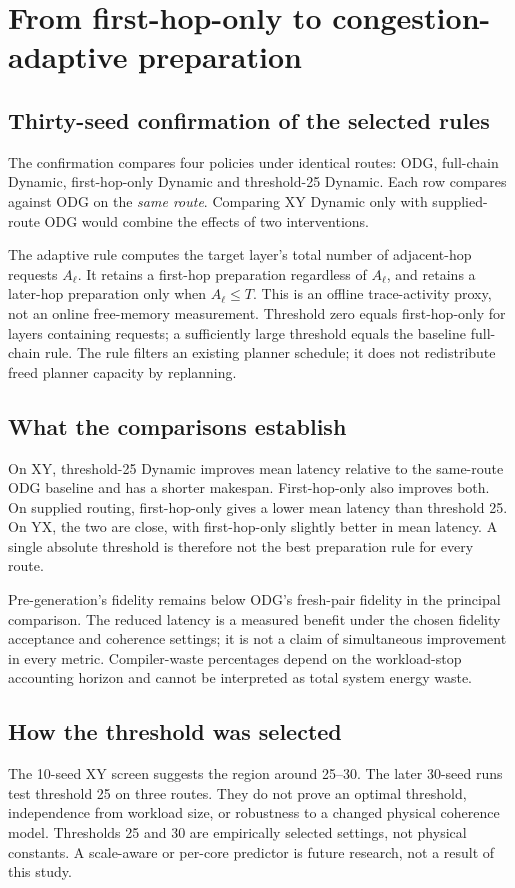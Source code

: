 \documentclass[11pt,a4paper,oneside]{report}
\begin{document}
\chapter{From first-hop-only to congestion-adaptive preparation}
\section{Thirty-seed confirmation of the selected rules}
The confirmation compares four policies under identical routes: ODG, full-chain Dynamic, first-hop-only Dynamic and threshold-25 Dynamic. Each row compares against ODG on the \emph{same route}. Comparing XY Dynamic only with supplied-route ODG would combine the effects of two interventions.

The adaptive rule computes the target layer's total number of adjacent-hop requests $A_\ell$. It retains a first-hop preparation regardless of $A_\ell$, and retains a later-hop preparation only when $A_\ell\le T$. This is an offline trace-activity proxy, not an online free-memory measurement. Threshold zero equals first-hop-only for layers containing requests; a sufficiently large threshold equals the baseline full-chain rule. The rule filters an existing planner schedule; it does not redistribute freed planner capacity by replanning.



\section{What the comparisons establish}
On XY, threshold-25 Dynamic improves mean latency relative to the same-route ODG baseline and has a shorter makespan. First-hop-only also improves both. On supplied routing, first-hop-only gives a lower mean latency than threshold 25. On YX, the two are close, with first-hop-only slightly better in mean latency. A single absolute threshold is therefore not the best preparation rule for every route.

Pre-generation's fidelity remains below ODG's fresh-pair fidelity in the principal comparison. The reduced latency is a measured benefit under the chosen fidelity acceptance and coherence settings; it is not a claim of simultaneous improvement in every metric. Compiler-waste percentages depend on the workload-stop accounting horizon and cannot be interpreted as total system energy waste.

\section{How the threshold was selected}

The 10-seed XY screen suggests the region around 25--30. The later 30-seed runs test threshold 25 on three routes. They do not prove an optimal threshold, independence from workload size, or robustness to a changed physical coherence model. Thresholds 25 and 30 are empirically selected settings, not physical constants. A scale-aware or per-core predictor is future research, not a result of this study.
\end{document}
